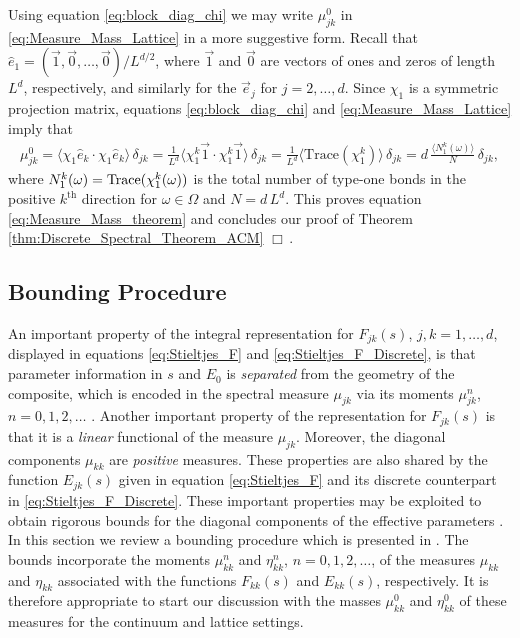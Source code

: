 \documentclass{cmslatex}
\begin{document}
Using equation \eqref{eq:block_diag_chi} we may write
$\mu^0_{jk}$ in \eqref{eq:Measure_Mass_Lattice} in a more suggestive
form. Recall that $\hat{e}_1=(\vec{1},\vec{0},\ldots,\vec{0})/L^{d/2}$,
where $\vec{1}$ and $\vec{0}$ are vectors of ones and zeros of length
$L^d$, respectively, and similarly for the $\vec{e}_j$ for
$j=2,\ldots,d$. Since $\chi_1$ is a symmetric projection matrix, equations 
\eqref{eq:block_diag_chi} and \eqref{eq:Measure_Mass_Lattice} imply
that 
%
\begin{align}\label{eq:Measure_Mass_Lattice_Trace}
  \mu^0_{jk}%
       =\langle\chi_1\hat{e}_k\cdot\chi_1\hat{e}_k\rangle\,\delta_{jk}
       =\frac{1}{L^d}\langle\chi_1^k\vec{1}\cdot \chi_1^k\vec{1}\rangle\,\delta_{jk}
       =\frac{1}{L^d}\langle\text{Trace}(\chi_1^k)\rangle\,\delta_{jk}
       =d\,\frac{\langle N_1^k(\omega)\rangle}{N}\,\delta_{jk},       
\end{align}
%
where $N_1^k(\omega)={\rm Trace}(\chi_1^k(\omega))$ is the total number of type-one
bonds in the positive $k^{\text{th}}$ direction for $\omega\in\Omega$ and
$N=d\,L^d$. This proves equation \eqref{eq:Measure_Mass_theorem} and
concludes our proof of Theorem \ref{thm:Discrete_Spectral_Theorem_ACM}
$\Box\,$.       

\subsection{Bounding Procedure}\label{sec:Bounding_Procedure}
%
An important property of the integral representation for $F_{jk}(s)$,
$j,k=1,\ldots,d$, displayed in equations \eqref{eq:Stieltjes_F} and
\eqref{eq:Stieltjes_F_Discrete}, is that parameter information in $s$
and $E_0$ is \emph{separated} from the geometry of the composite,
which is encoded in the spectral measure $\mu_{jk}$ via its moments  
$\mu^n_{jk}$, $n=0,1,2,\ldots$ \cite{Bruno:JSP-365,Golden:CMP-473}. Another
important property of the representation for $F_{jk}(s)$ is that it
is a \emph{linear} functional of the measure $\mu_{jk}$. Moreover, the
diagonal components $\mu_{kk}$ are \emph{positive} measures. These
properties are also shared by the function $E_{jk}(s)$ given in
equation \eqref{eq:Stieltjes_F} and its discrete counterpart in
\eqref{eq:Stieltjes_F_Discrete}. These important properties may be
exploited to obtain rigorous bounds for the diagonal components of the
effective parameters
\cite{Bergman:PRC-377,Bergman:PRL-1285,Milton:APL-300,Golden:CMP-473,Bergman:AP-78}. 
In this section we review a bounding procedure which is presented in 
\cite{Golden:CMP-473,Golden:JMPS-333}. The bounds incorporate the
moments $\mu_{kk}^n$ and $\eta_{kk}^n$, $n=0,1,2,\ldots$, of the measures
$\mu_{kk}$ and $\eta_{kk}$ associated with the functions $F_{kk}(s)$ and
$E_{kk}(s)$, respectively. It is therefore appropriate to start our
discussion with the masses $\mu_{kk}^0$ and $\eta_{kk}^0$ of these measures
for the continuum and lattice settings. 
\end{document}
